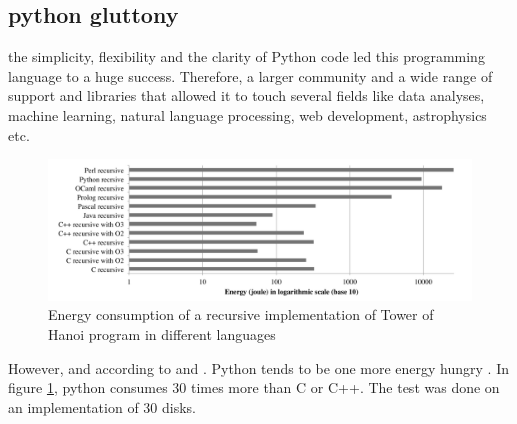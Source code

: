 


\subsection{python gluttony}

the simplicity, flexibility and the clarity of Python code led this programming language to a huge success. Therefore, a larger community and a wide range of support and libraries that allowed it to touch several fields like data analyses, machine learning, natural language processing, web development, astrophysics etc.
\begin{figure}[htbp]
    \includegraphics[width=\linewidth]{imgs/hannoiimplementation.png}
    \caption{Energy consumption of a recursive implementation of Tower of Hanoi program in different languages~\cite{noureddine_preliminary_2012}}
    \label{fig:hannoi}
\end{figure}

However, and according to \cite{pinto_energy_2017} and \cite{noureddine_preliminary_2012}. Python tends to be one more energy hungry . In figure \ref{fig:hannoi}, python consumes 30 times more than C or C++. The test was done on an implementation of   30 disks.


